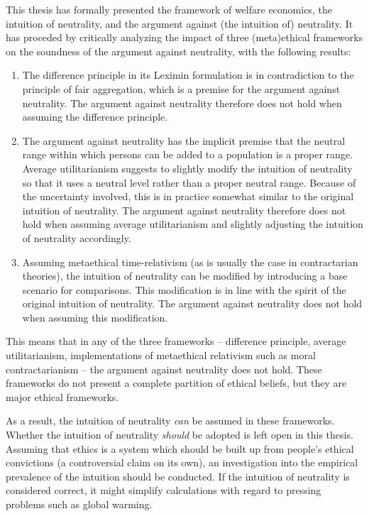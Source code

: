 This thesis has formally presented the framework of welfare economics, the intuition of neutrality, and the argument against (the intuition of) neutrality. It has proceded by critically analyzing the impact of three (meta)ethical frameworks on the soundness of the argument against neutrality, with the following results:
\begin{enumerate}
\item The difference principle in its Leximin formulation is in contradiction to the principle of fair aggregation, which is a premise for the argument against neutrality. The argument against neutrality therefore does not hold when assuming the difference principle. 
\item The argument against neutrality has the implicit premise that the neutral range within which persons can be added to a population is a proper range. Average utilitarianism suggests to slightly modify the intuition of neutrality so that it uses a neutral level rather than a proper neutral range. Because of the uncertainty involved, this is in practice somewhat similar to the original intuition of neutrality. The argument against neutrality therefore does not hold when assuming average utilitarianism and slightly adjusting the intuition of neutrality accordingly.
\item Assuming metaethical time-relativism (as is usually the case in contractarian theories), the intuition of neutrality can be modified by introducing a base scenario for comparisons. This modification is in line with the spirit of the original intuition of neutrality. The argument against neutrality does not hold when assuming this modification. 
\end{enumerate}
This means that in any of the three frameworks -- difference principle, average utilitarianism, implementations of metaethical relativism such as moral contractarianism -- the argument against neutrality does not hold. These frameworks do not present a complete partition of ethical beliefs, but they are major ethical frameworks. 

As a result, the intuition of neutrality \emph{can} be assumed in these frameworks. Whether the intuition of neutrality \emph{should} be adopted is left open in this thesis. Assuming that ethics is a system which should be built up from people's ethical convictions (a controversial claim on its own), an investigation into the empirical prevalence of the intuition should be conducted. If the intuition of neutrality is considered correct, it might simplify calculations with regard to pressing problems such as global warming. 
